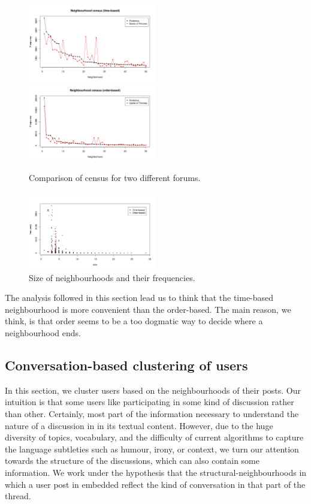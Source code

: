 \documentclass[conference]{IEEEtran}
\begin{document}
\begin{figure}
\centering
\includegraphics[width=0.5\textwidth]{time_neighbourhood_census_compare_forums}%
\includegraphics[width=0.5\textwidth]{order_neighbourhood_census_compare_forums}
\caption{Comparison of census for two different forums.}
\label{fig:census_compare}
\end{figure}

\begin{figure}
\centering
\includegraphics[width=0.5\textwidth]{census_size_vs_freq_gameofthrones}
\caption{Size of neighbourhoods and their frequencies.}
\label{fig:census_size_vs_freq}
\end{figure}


The analysis followed in this section lead us to think that the time-based neighbourhood is more convenient than the order-based. The main reason, we think, is that order seems to be a too dogmatic way to decide where a neighbourhood ends.

\subsection{Conversation-based clustering of users}
In this section, we cluster users based on the neighbourhoods of their posts. Our intuition is that some users like participating in some kind of discussion rather than other. Certainly, most part of the information necessary to understand the nature of a discussion in in its textual content. However, due to the huge diversity of topics, vocabulary, and the difficulty of current algorithms to capture the language subtleties such as humour, irony, or context, we turn our attention towards the structure of the discussions, which can also contain some information. We work under the  hypothesis that the structural-neighbourhoods in which a user post in embedded reflect the kind of conversation in that part of the thread. 
\end{document}
